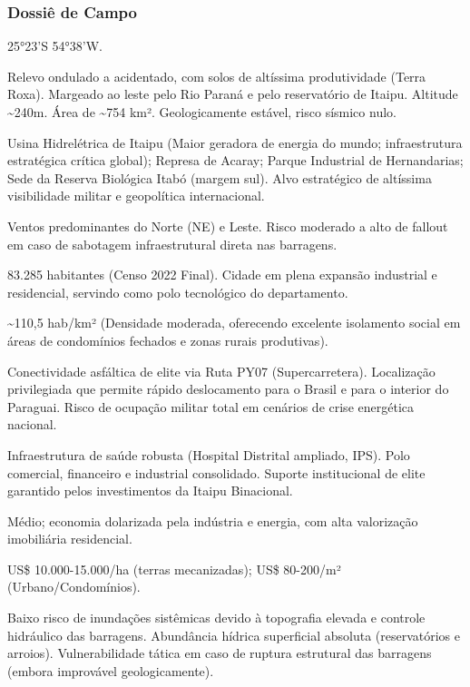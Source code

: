 \subsubsection{Dossiê de Campo}
\begin{description}[style=nextline,leftmargin=0.5cm,font=\bfseries]
\item[Coordenadas]  25°23'S 54°38'W.
\item[Topografia]  Relevo ondulado a acidentado, com solos de altíssima produtividade (Terra Roxa). Margeado ao leste pelo Rio Paraná e pelo reservatório de Itaipu. Altitude \textasciitilde 240m. Área de \textasciitilde 754 km². Geologicamente estável, risco sísmico nulo.
\item[Alvos Estratégicos]  Usina Hidrelétrica de Itaipu (Maior geradora de energia do mundo; infraestrutura estratégica crítica global); Represa de Acaray; Parque Industrial de Hernandarias; Sede da Reserva Biológica Itabó (margem sul). Alvo estratégico de altíssima visibilidade militar e geopolítica internacional.
\item[Fallout]  Ventos predominantes do Norte (NE) e Leste. Risco moderado a alto de fallout em caso de sabotagem infraestrutural direta nas barragens.
\item[População]  83.285 habitantes (Censo 2022 Final). Cidade em plena expansão industrial e residencial, servindo como polo tecnológico do departamento.
\item[Densidade]  \textasciitilde 110,5 hab/\allowbreak km² (Densidade moderada, oferecendo excelente isolamento social em áreas de condomínios fechados e zonas rurais produtivas).
\item[Vias de Acesso]  Conectividade asfáltica de elite via Ruta PY07 (Supercarretera). Localização privilegiada que permite rápido deslocamento para o Brasil e para o interior do Paraguai. Risco de ocupação militar total em cenários de crise energética nacional.
\item[Serviços]  Infraestrutura de saúde robusta (Hospital Distrital ampliado, IPS). Polo comercial, financeiro e industrial consolidado. Suporte institucional de elite garantido pelos investimentos da Itaipu Binacional.
\item[Custo de Vida]  Médio; economia dolarizada pela indústria e energia, com alta valorização imobiliária residencial.
\item[Preço da Terra]  US\$ 10.000-15.000/\allowbreak ha (terras mecanizadas); US\$ 80-200/\allowbreak m² (Urbano/\allowbreak Condomínios).
\item[Hidrologia]  Baixo risco de inundações sistêmicas devido à topografia elevada e controle hidráulico das barragens. Abundância hídrica superficial absoluta (reservatórios e arroios). Vulnerabilidade tática em caso de ruptura estrutural das barragens (embora improvável geologicamente).

\end{description}
